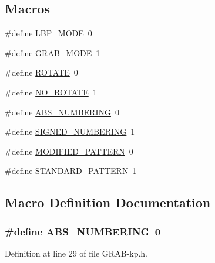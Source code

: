 \subsection*{Macros}
\begin{DoxyCompactItemize}
\item 
\#define \hyperlink{_g_r_a_b-kp_8h_a6b33b99442f7c7d9e94f003528a86501}{L\-B\-P\-\_\-\-M\-O\-D\-E}~0
\item 
\#define \hyperlink{_g_r_a_b-kp_8h_a66425a38b0c7937c73f50847524a3595}{G\-R\-A\-B\-\_\-\-M\-O\-D\-E}~1
\item 
\#define \hyperlink{_g_r_a_b-kp_8h_ae38c87f421906975bf7500c3b779fbd1}{R\-O\-T\-A\-T\-E}~0
\item 
\#define \hyperlink{_g_r_a_b-kp_8h_ad30aa04d0c2e0be52306deb2c60dff35}{N\-O\-\_\-\-R\-O\-T\-A\-T\-E}~1
\item 
\#define \hyperlink{_g_r_a_b-kp_8h_a43697bbe14a19b7bfd3bc3a8966ffc24}{A\-B\-S\-\_\-\-N\-U\-M\-B\-E\-R\-I\-N\-G}~0
\item 
\#define \hyperlink{_g_r_a_b-kp_8h_a591937bc56bfef3fd4e606da1e9bb6e1}{S\-I\-G\-N\-E\-D\-\_\-\-N\-U\-M\-B\-E\-R\-I\-N\-G}~1
\item 
\#define \hyperlink{_g_r_a_b-kp_8h_a3d2cac756a32f6fc8a16ea6bf5f7fa64}{M\-O\-D\-I\-F\-I\-E\-D\-\_\-\-P\-A\-T\-T\-E\-R\-N}~0
\item 
\#define \hyperlink{_g_r_a_b-kp_8h_a5daa478426a73c9de86ceb44488ca3d8}{S\-T\-A\-N\-D\-A\-R\-D\-\_\-\-P\-A\-T\-T\-E\-R\-N}~1
\end{DoxyCompactItemize}


\subsection{Macro Definition Documentation}
\hypertarget{_g_r_a_b-kp_8h_a43697bbe14a19b7bfd3bc3a8966ffc24}{
\subsubsection[{A\-B\-S\-\_\-\-N\-U\-M\-B\-E\-R\-I\-N\-G}]{\setlength{\rightskip}{0pt plus 5cm}\#define A\-B\-S\-\_\-\-N\-U\-M\-B\-E\-R\-I\-N\-G~0}}\label{_g_r_a_b-kp_8h_a43697bbe14a19b7bfd3bc3a8966ffc24}


Definition at line 29 of file G\-R\-A\-B-\/kp.\-h.

